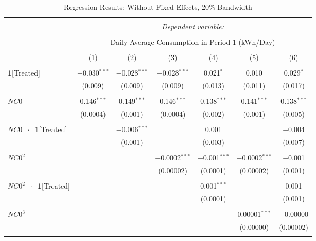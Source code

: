 \begin{table}[!htbp]
\centering 
\caption{Regression Results: Without Fixed-Effects, 20\% Bandwidth} 
\label{Table:Regression-Results_Daily-Average_20P-BW-Without-FEs} 
\small 
\begin{adjustbox}{scale = 0.8}
\begin{tabular}{@{\extracolsep{25pt}}lcccccc} 
\\[-1.8ex]\hline 
\hline \\[-1.8ex] 
 & \multicolumn{6}{c}{\textit{Dependent variable:}} \\ 
\cline{2-7} 
\\[-1.8ex] & \multicolumn{6}{c}{Daily Average Consumption in Period 1 (kWh/Day)} \\ 
\\[-1.8ex] & (1) & (2) & (3) & (4) & (5) & (6)\\ 
\hline \\[-1.8ex] 
 \textbf{1}[Treated] & $-$0.030$^{***}$ & $-$0.028$^{***}$ & $-$0.028$^{***}$ & 0.021$^{*}$ & 0.010 & 0.029$^{*}$ \\ 
  & (0.009) & (0.009) & (0.009) & (0.013) & (0.011) & (0.017) \\ 
  & & & & & & \\ 
 $NC0$ & 0.146$^{***}$ & 0.149$^{***}$ & 0.146$^{***}$ & 0.138$^{***}$ & 0.141$^{***}$ & 0.138$^{***}$ \\ 
  & (0.0004) & (0.001) & (0.0004) & (0.002) & (0.001) & (0.005) \\ 
  & & & & & & \\ 
 $NC0$  $\ \cdot \ $ \textbf{1}[Treated] &  & $-$0.006$^{***}$ &  & 0.001 &  & $-$0.004 \\ 
  &  & (0.001) &  & (0.003) &  & (0.007) \\ 
  & & & & & & \\ 
 $NC0^{2}$ &  &  & $-$0.0002$^{***}$ & $-$0.001$^{***}$ & $-$0.0002$^{***}$ & $-$0.001 \\ 
  &  &  & (0.00002) & (0.0001) & (0.00002) & (0.001) \\ 
  & & & & & & \\ 
 $NC0^{2}$  $\ \cdot \ $ \textbf{1}[Treated] &  &  &  & 0.001$^{***}$ &  & 0.001 \\ 
  &  &  &  & (0.0001) &  & (0.001) \\ 
  & & & & & & \\ 
 $NC0^{3}$ &  &  &  &  & 0.00001$^{***}$ & $-$0.00000 \\ 
  &  &  &  &  & (0.00000) & (0.00002) \\ 
  & & & & & & \\ 

\end{tabular}
\end{adjustbox}
\end{table}

